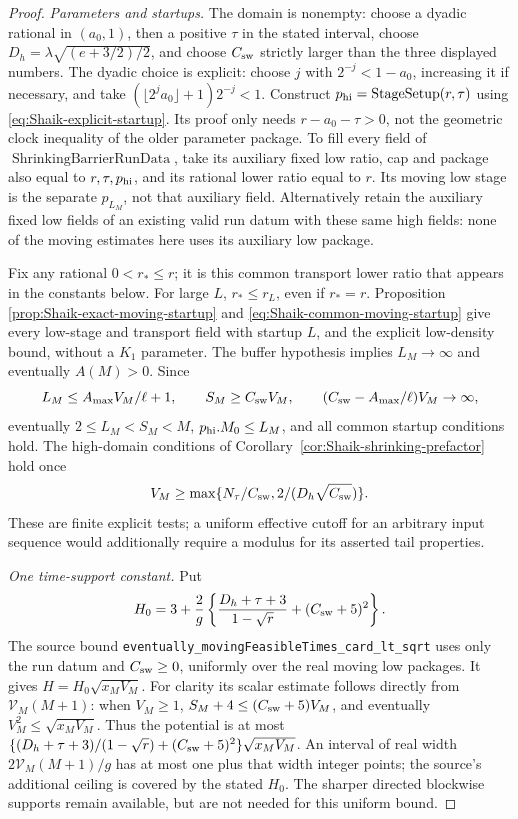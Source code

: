\begin{proof}
\emph{Parameters and startups.}
The domain is nonempty: choose a dyadic rational in \((a_0,1)\),
then a positive \(\tau\) in the stated interval, choose
\(D_h=\lambda\sqrt{(e+3/2)/2}\), and choose \(C_{\rm sw}\) strictly
larger than the three displayed numbers. The dyadic choice is explicit:
choose \(j\) with \(2^{-j}<1-a_0\), increasing it if necessary, and take
\((\lfloor2^ja_0\rfloor+1)2^{-j}<1\).
Construct \(p_{\rm hi}=\operatorname{StageSetup}(r,\tau)\) using
\eqref{eq:Shaik-explicit-startup}. Its proof only needs
\(r-a_0-\tau>0\), not the geometric clock inequality of the older
parameter package. To fill every field of
\(\operatorname{ShrinkingBarrierRunData}\), take its auxiliary fixed
low ratio, cap and package also equal to \(r,\tau,p_{\rm hi}\), and
its rational lower ratio equal to \(r\). Its moving low stage is
the separate \(p_{L_M}\), not that auxiliary field.
Alternatively retain the auxiliary fixed low fields of an existing valid
run datum with these same high fields: none of the moving estimates here
uses its auxiliary low package.

Fix any rational \(0<r_*\le r\); it is this common transport lower
ratio that appears in the constants below. For large \(L\),
\(r_*\le r_L\), even if \(r_*=r\). Proposition
\ref{prop:Shaik-exact-moving-startup} and
\eqref{eq:Shaik-common-moving-startup} give every low-stage and
transport field with startup \(L\), and the explicit low-density
bound, without a \(K_1\) parameter. The buffer hypothesis implies
\(L_M\to\infty\) and eventually \(A(M)>0\). Since
\[
 L_M\le A_{\max}V_M/\ell+1,\qquad
 S_M\ge C_{\rm sw}V_M,\qquad
 (C_{\rm sw}-A_{\max}/\ell)V_M\to\infty,
\]
eventually \(2\le L_M<S_M<M\), \(p_{\rm hi}.M_0\le L_M\), and all
common startup conditions hold. The high-domain conditions of
Corollary~\ref{cor:Shaik-shrinking-prefactor} hold once
\[
 V_M\ge\max\{N_\tau/C_{\rm sw},
                     2/(D_h\sqrt{C_{\rm sw}})\}.
\]
These are finite explicit tests; a uniform effective cutoff for an
arbitrary input sequence would additionally require a modulus for
its asserted tail properties.

\emph{One time-support constant.}
Put
\[
 H_0=3+\frac2g\left\{\frac{D_h+\tau+3}{1-\sqrt r}
                                      +(C_{\rm sw}+5)^2\right\}.
\]
The source bound
\texttt{eventually\_movingFeasibleTimes\_card\_lt\_sqrt} uses only
the run datum and \(C_{\rm sw}\ge0\), uniformly over the real
moving low packages. It gives \(H=H_0\sqrt{x_MV_M}\).
For clarity its scalar estimate follows directly from
\(\mathcal V_M(M+1)\): when \(V_M\ge1\),
\(S_M+4\le(C_{\rm sw}+5)V_M\), and eventually
\(V_M^2\le\sqrt{x_MV_M}\).
Thus the potential is at most
\(\{(D_h+\tau+3)/(1-\sqrt r)+(C_{\rm sw}+5)^2\}
\sqrt{x_MV_M}\). An interval of real width
\(2\mathcal V_M(M+1)/g\) has at most one plus that width integer
points; the source's additional ceiling is covered by the stated
\(H_0\). The sharper directed blockwise supports remain available,
but are not needed for this uniform bound.


\end{proof}
